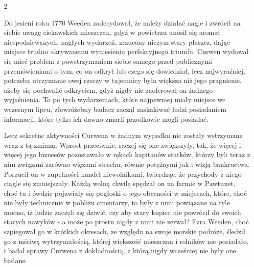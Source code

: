 \begin{center}
2
\end{center}

Do jesieni roku 1770 Weeden zadecydował, że należy działać nagle i zwrócił na siebie uwagę ciekawskich mieszczan, gdyż w powietrzu unosił się aromat niespodziewanych, nagłych wydarzeń, zrzucony niczym stary płaszcz, dając miejsce trudno ukrywanemu wyniesieniu perfekcyjnego triumfu. Curwen wydawał się mieć problem z powstrzymaniem siebie samego przed publicznymi przemówieniami o tym, co on odkrył lub czego się dowiedział, lecz najwyraźniej, potrzeba utrzymanie owej rzeczy w tajemnicy była większa niż jego pragnienie, ażeby się pochwalić odkryciem, gdyż nigdy nie zaoferował on żadnego wyjaśnienia. To po tych wydarzeniach, które najpewniej miały miejsce we wczesnym lipcu, złowróżebny badacz zaczął zaskakiwać ludzi posiadaniem informacji, które tylko ich dawno zmarli przodkowie mogli posiadać.

Lecz sekretne aktywności Curwena w żadnym wypadku nie zostały wstrzymane wraz z tą zmianą. Wprost przeciwnie, raczej się one zwiększyły, tak, że więcej i więcej jego biznesów pozostawało w rękach kapitanów statków, którzy byli teraz z nim związani zarówno więzami strachu, równie potężnymi jak i wizją bankructwa. Porzucił on w zupełności handel niewolnikami, twierdząc, że przychody z niego ciągle się zmniejszały. Każdą wolną chwilę spędzał on na farmie w Pawtuxet, choć tu i ówdzie pojawiały się pogłoski o jego obecności w miejscach, które, choć nie były technicznie w pobliżu cmentarzy, to były z nimi powiązane na tyle mocno, iż ludzie zaczęli się dziwić, czy aby stary kupiec nie powrócił do swoich starych nawyków - a może po prostu nigdy z nimi nie zerwał? Ezra Weeden, choć szpiegował go w krótkich okresach, ze względu na swoje morskie podróże, śledził go z mściwą wytrzymałością, której większość mieszczan i rolników nie posiadało, i badał sprawy Curwena z dokładnością, z którą nigdy wcześniej nie były one badane. 

